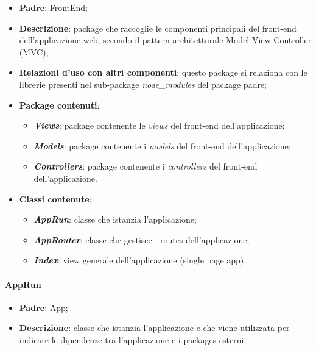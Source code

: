 \begin{itemize}
	\item \textbf{Padre}: FrontEnd;
	
	\item \textbf{Descrizione}: package che raccoglie le componenti principali del front-end dell'applicazione web, secondo il pattern architetturale Model-View-Controller (MVC);
	
	\item \textbf{Relazioni d’uso con altri componenti}: questo package si relaziona con le librerie presenti nel sub-package \textit{node\_modules} del package padre;
	
	\item \textbf{Package contenuti}:
		\begin{itemize}
			\item \textbf{\textit{Views}}: package contenente le \textit{views} del front-end dell'applicazione;
			
			\item \textbf{\textit{Models}}: package contenente i \textit{models} del front-end dell'applicazione;
			
			\item \textbf{\textit{Controllers}}: package contenente i \textit{controllers} del front-end dell'applicazione.
		\end{itemize}
	\item \textbf{Classi contenute}:
		\begin{itemize}
			
			\item \textbf{\textit{AppRun}}: classe che istanzia l'applicazione;
			
			\item \textbf{\textit{AppRouter}}: classe che gestisce i routes dell'applicazione;
			
			\item \textbf{\textit{Index}}: view generale dell'applicazione (single page app).
		\end{itemize}
\end{itemize}

\paragraph{AppRun}

\begin{itemize}
	\item \textbf{Padre}: App;
	
	\item \textbf{Descrizione}: classe che istanzia l'applicazione e che viene utilizzata per indicare le dipendenze tra l'applicazione e i packages esterni.
\end{itemize}

